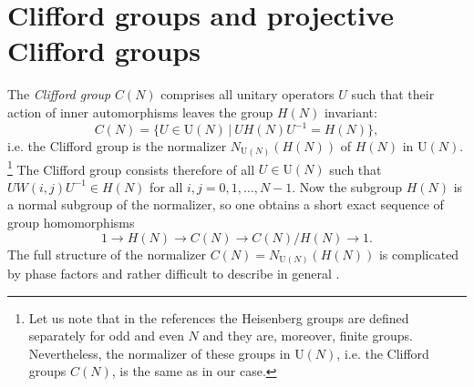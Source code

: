 \documentclass[10pt]{amsart}
\theoremstyle{plain}
\theoremstyle{definition}
\theoremstyle{remark}%
\newcommand{\Z}{\mathbb{Z}}
\newcommand{\R}{\mathbb{R}}
\newcommand{\set}[2]{\{#1\,|\ #2\}}
\newcommand{\U}{\mathrm{U}}
\begin{document}







\section{Clifford groups and projective Clifford groups}\label{section_4}


The \emph{Clifford group} $C(N)$ comprises all unitary operators $U$ such that their action of inner automorphisms leaves the group $H(N)$ invariant:
$$ C(N)=\set{U\in \U(N)}{UH(N) U^{-1} = H(N)},
$$
i.e. the Clifford group is the normalizer $N_{\U(N)}(H(N))$ of $H(N)$  in $\U(N)$.
\footnote{Let us note that in the references \cite{appleby,BengtssonZyczkowski} the Heisenberg groups are defined separately for odd and even $N$ and they are, moreover, finite groups. Nevertheless, the normalizer of these groups in $\U(N)$, i.e. the Clifford groups $C(N)$, is the same as in our case.}
The Clifford group consists therefore of all $U \in \U(N)$ such that
$UW(i,j) U^{-1} \in H(N)$ for all $i,j=0,1,\dots,N-1$.
Now the subgroup $H(N)$ is a normal subgroup of the normalizer,
so one obtains a short exact sequence of group homomorphisms
\begin{equation} \label{8}
     1 \rightarrow H(N) \rightarrow C(N)
\rightarrow C(N)/H(N)  \rightarrow 1 .
\end{equation}
The full structure of the normalizer
$C(N) = N_{\U(N)}(H(N))$ is complicated by phase factors
and rather difficult to describe in general \cite{Hostens}. 
\end{document}
